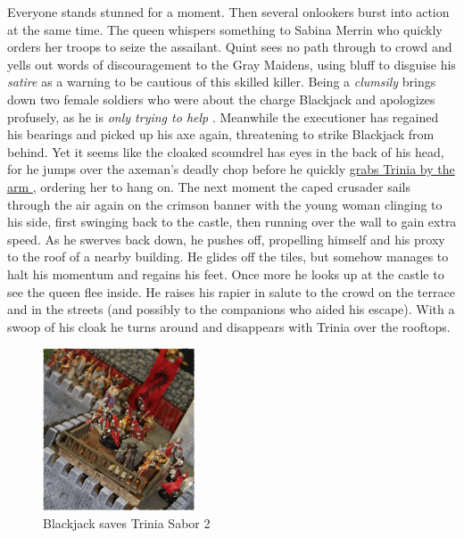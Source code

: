 Everyone stands stunned for a moment. Then several onlookers burst into action at the same time. The queen whispers something to Sabina Merrin who quickly orders her troops to seize the assailant. Quint sees no path through to crowd and yells out words of discouragement to the Gray Maidens, using bluff to disguise his {\itshape satire} as a warning to be cautious of this skilled killer. Being a  {\itshape clumsily} brings down two female soldiers who were about the charge Blackjack and apologizes profusely, as he is  {\itshape only trying to help} . Meanwhile the executioner has regained his bearings and picked up his axe again, threatening to strike Blackjack from behind. Yet it seems like the cloaked scoundrel has eyes in the back of his head, for he jumps over the axeman's deadly chop before he quickly \hyperref[fig:Blackjack-saves-Trinia-Sabor-2-472559200]{ grabs Trinia by the arm } , ordering her to hang on. The next moment the caped crusader sails through the air again on the crimson banner with the young woman clinging to his side, first swinging back to the castle, then running over the wall to gain extra speed. As he swerves back down, he pushes off, propelling himself and his proxy to the roof of a nearby building. He glides off the tiles, but somehow manages to halt his momentum and regains his feet. Once more he looks up at the castle to see the queen flee inside. He raises his rapier in salute to the crowd on the terrace and in the streets (and possibly to the companions who aided his escape). With a swoop of his cloak he turns around and disappears with Trinia over the rooftops. \\

\begin{figure}[h]
	\centering
	\includegraphics[width=0.4\textwidth]{images/Blackjack-saves-Trinia-Sabor-2-472559200_mod.jpg}
	\caption{Blackjack saves Trinia Sabor 2}
	\label{fig:Blackjack-saves-Trinia-Sabor-2-472559200}
\end{figure}

